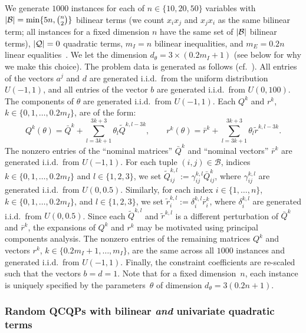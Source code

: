 \documentclass{article}
\DeclarePairedDelimiter\abs{\lvert}{\rvert}%
\begin{document}
We generate $1000$ instances for each of $n \in \{10, 20, 50\}$ variables with $\abs{\mathcal{B}} = \min\{5n, \binom{n}{2}\}$ bilinear terms (we count $x_i x_j$ and $x_j x_i$ as the same bilinear term; all instances for a fixed dimension $n$ have the same set of $\abs{\mathcal{B}}$ bilinear terms), $\abs{\mathcal{Q}} = 0$ quadratic terms, $m_I = n$ bilinear inequalities, and $m_E = 0.2n$ linear equalities~\cite{bao2011semidefinite}.
We let the dimension $d_{\theta} = 3 \times (0.2m_I + 1)$ (see below for why we make this choice).
The problem data is generated as follows (cf.\ \cite{bao2011semidefinite}).
All entries of the vectors $a^j$ and $d$ are generated i.i.d.\ from the uniform distribution $U(-1,1)$, and all entries of the vector $b$ are generated i.i.d.\ from $U(0,100)$.
The components of $\theta$ are generated i.i.d.\ from $U(-1,1)$.
Each $Q^k$ and $r^k$, $k \in \{0,1,\dots,0.2m_I\}$, are of the form:
\[
Q^k(\theta) = \bar{Q}^k + \displaystyle\sum_{l=3k+1}^{3k+3} \theta_{l} \tilde{Q}^{k,l-3k}, \qquad r^k(\theta) = \bar{r}^k + \displaystyle\sum_{l=3k+1}^{3k+3} \theta_{l} \tilde{r}^{k,l-3k}.
\]
The nonzero entries of the ``nominal matrices'' $\bar{Q}^k$ and ``nominal vectors'' $\bar{r}^k$ are generated i.i.d.\ from $U(-1,1)$. 
For each tuple $(i,j) \in \mathcal{B}$, indices $k \in \{0,1,\dots,0.2m_I\}$ and $l \in \{1,2,3\}$, we set $\tilde{Q}^{k,l}_{ij} := \gamma^{k,l}_{ij} \bar{Q}^k_{ij}$, where $\gamma^{k,l}_{ij}$ are generated i.i.d.\ from $U(0,0.5)$. 
Similarly, for each index $i \in \{1,\dots,n\}$, $k \in \{0,1,\dots,0.2m_I\}$, and $l \in \{1,2,3\}$, we set $\tilde{r}^{k,l}_i := \delta^{k,l}_i \bar{r}^k_i$, where $\delta^{k,l}_i$ are generated i.i.d.\ from $U(0,0.5)$. 
Since each $\tilde{Q}^{k,l}$ and $\tilde{r}^{k,l}$ is a different perturbation of $\bar{Q}^k$ and $\bar{r}^k$, the expansions of $Q^k$ and $r^k$ may be motivated using principal components analysis.
The nonzero entries of the remaining matrices $Q^k$ and vectors $r^k$, $k \in \{0.2m_I+1,\dots,m_I\}$, are the same across all $1000$ instances and generated i.i.d.\ from $U(-1,1)$.
Finally, the constraint coefficients are re-scaled such that the vectors $b = d = 1$.
Note that for a fixed dimension~$n$, each instance is uniquely specified by the parameters~$\theta$ of dimension $d_{\theta} = 3 (0.2n + 1)$.






\subsubsection{Random QCQPs with bilinear \textit{and} univariate quadratic terms}
\label{subsubsec:random_qcqps}
\end{document}
